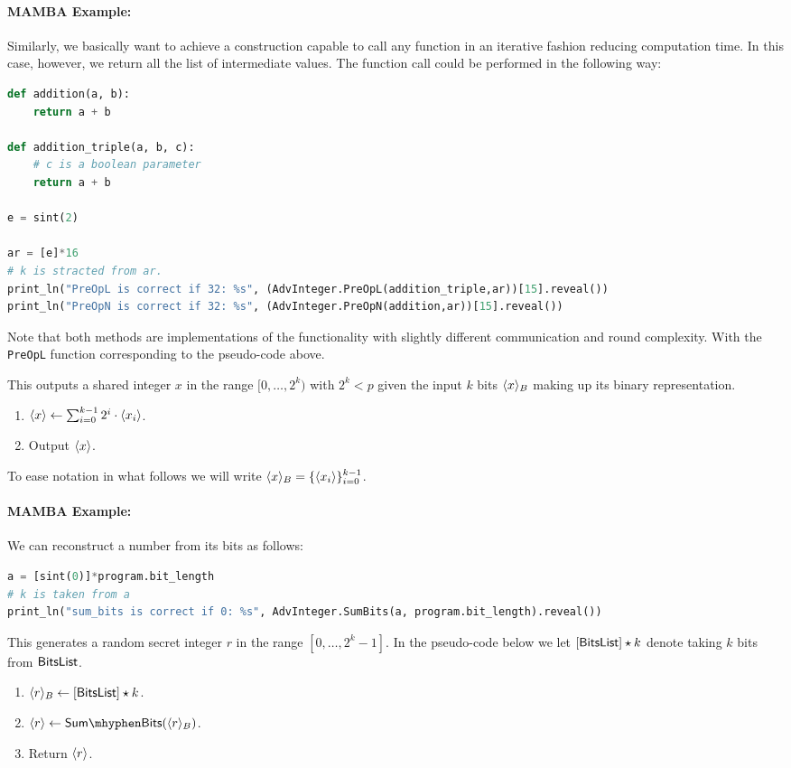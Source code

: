 \paragraph{MAMBA Example:} Similarly, we basically want to achieve a construction capable to call any function in an iterative fashion reducing computation time. In this case, however, we return all the list of intermediate values. The function call could be performed in the following way: 
\begin{lstlisting}[language={python}]
def addition(a, b):
    return a + b

def addition_triple(a, b, c):
	# c is a boolean parameter
    return a + b
    
e = sint(2)

ar = [e]*16
# k is stracted from ar.
print_ln("PreOpL is correct if 32: %s", (AdvInteger.PreOpL(addition_triple,ar))[15].reveal())
print_ln("PreOpN is correct if 32: %s", (AdvInteger.PreOpN(addition,ar))[15].reveal())
\end{lstlisting}
Note that both methods are implementations of the functionality with slightly different  communication and round complexity.
With the \verb+PreOpL+ function corresponding to the pseudo-code above.

This outputs a shared integer $x$ in the range
$[0,\ldots,2^k)$ with $2^k<p$ given the input $k$ bits 
$\langle x \rangle_B$ making up its binary representation.
\begin{enumerate}
\item $\langle x \rangle \leftarrow \sum_{i=0}^{k-1} 2^i \cdot \langle x_i \rangle$.
\item Output $\langle x \rangle$.
\end{enumerate}
To ease notation in what follows we will write
$\langle x \rangle_B = \{\langle x_i \rangle\}_{i=0}^{k-1}$.

\paragraph{MAMBA Example:}  We can reconstruct a number from its bits as follows: 
\begin{lstlisting}[language={python}]
a = [sint(0)]*program.bit_length
# k is taken from a
print_ln("sum_bits is correct if 0: %s", AdvInteger.SumBits(a, program.bit_length).reveal())
\end{lstlisting}

This generates a random secret integer $r$ in the range $[0,\ldots,2^k-1]$.
In the pseudo-code below we let $[\mathsf{BitsList}]\star k$ denote taking
$k$ bits from $\mathsf{BitsList}$.
\begin{enumerate}
\item $\langle r \rangle_B \leftarrow [\mathsf{BitsList}]\star k$.
\item $\sshare{r} \asn \mathsf{Sum\mhyphen Bits}(\sshare{r}_B)$.
\item Return $\langle r \rangle$.
\end{enumerate}
